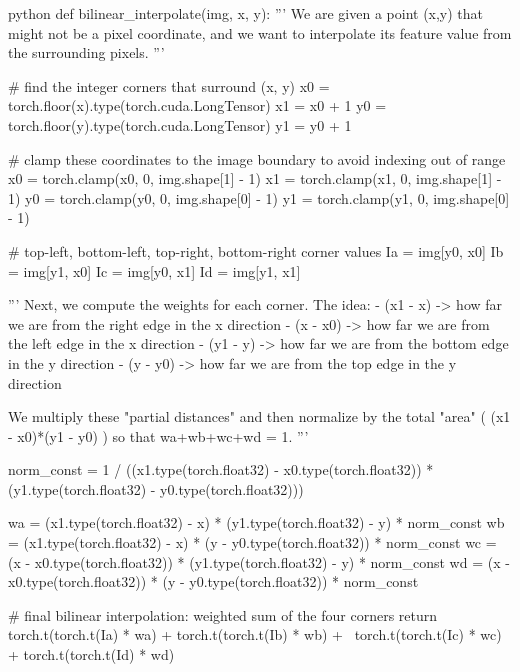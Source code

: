 \newpage

\begin{mintedbox}{python}
    def bilinear_interpolate(img, x, y):
        ''' We are given a point (x,y) that might not be a pixel coordinate,
        and we want to interpolate its feature value from the surrounding pixels. 
        '''
        
        # find the integer corners that surround (x, y)
        x0 = torch.floor(x).type(torch.cuda.LongTensor)
        x1 = x0 + 1
        y0 = torch.floor(y).type(torch.cuda.LongTensor)
        y1 = y0 + 1
        
        # clamp these coordinates to the image boundary to avoid indexing out of range
        x0 = torch.clamp(x0, 0, img.shape[1] - 1)
        x1 = torch.clamp(x1, 0, img.shape[1] - 1)
        y0 = torch.clamp(y0, 0, img.shape[0] - 1)
        y1 = torch.clamp(y1, 0, img.shape[0] - 1)
        
        # top-left, bottom-left, top-right, bottom-right corner values
        Ia = img[y0, x0]
        Ib = img[y1, x0]
        Ic = img[y0, x1]
        Id = img[y1, x1]
        
        '''
        Next, we compute the weights for each corner. The idea:
        - (x1 - x) -> how far we are from the right edge in the x direction
        - (x - x0) -> how far we are from the left edge in the x direction
        - (y1 - y) -> how far we are from the bottom edge in the y direction
        - (y - y0) -> how far we are from the top edge in the y direction
        
        We multiply these "partial distances" and then normalize by the total "area" 
        ( (x1 - x0)*(y1 - y0) ) so that wa+wb+wc+wd = 1.
        '''
        
        norm_const = 1 / ((x1.type(torch.float32) - x0.type(torch.float32)) *
        (y1.type(torch.float32) - y0.type(torch.float32)))
        
        wa = (x1.type(torch.float32) - x) * (y1.type(torch.float32) - y) * norm_const
        wb = (x1.type(torch.float32) - x) * (y - y0.type(torch.float32)) * norm_const
        wc = (x - x0.type(torch.float32)) * (y1.type(torch.float32) - y) * norm_const
        wd = (x - x0.type(torch.float32)) * (y - y0.type(torch.float32)) * norm_const
        
        # final bilinear interpolation: weighted sum of the four corners
        return torch.t(torch.t(Ia) * wa) + torch.t(torch.t(Ib) * wb) + \
        torch.t(torch.t(Ic) * wc) + torch.t(torch.t(Id) * wd)
\end{mintedbox}

